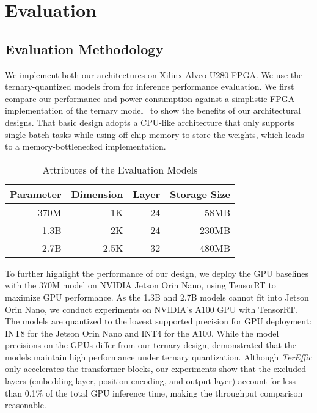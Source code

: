 \section{Evaluation}
\subsection{Evaluation Methodology}
We implement both our architectures on Xilinx Alveo U280 FPGA. We use the ternary-quantized models from \cite{scalable} for inference performance evaluation. 
We first compare our performance and power consumption against a simplistic FPGA implementation of the ternary model~\cite{scalable} to show the benefits of our architectural designs. That basic design adopts a CPU-like architecture that only supports single-batch tasks while using off-chip memory to store the weights, which leads to a memory-bottlenecked implementation.

\begin{table}[h]
    \vspace{-3mm}
    \centering
    \caption{Attributes of the Evaluation Models}
    \label{tab:models} 
    \begin{tabular}{|r|r|r|r|}
        \hline
        Parameter& Dimension & Layer & Storage Size  \\
        \hline
        370M & 1K & 24 & 58MB \\
        \hline
        1.3B & 2K & 24 & 230MB \\
        \hline
        2.7B & 2.5K
        & 32 & 480MB \\
        \hline
    \end{tabular}
    \vspace{-4mm}
\end{table}

To further highlight the performance of our design, we deploy the GPU baselines with the 370M model on NVIDIA Jetson Orin Nano, using TensorRT\cite{TensorRT} to maximize GPU performance. As the 1.3B and 2.7B models cannot fit into Jetson Orin Nano, we conduct experiments on NVIDIA's A100 GPU with TensorRT.  The models are quantized to the lowest supported precision for GPU deployment: INT8 for the Jetson Orin Nano and INT4 for the A100. While the model precisions on the GPUs differ from our ternary design, \cite{scalable} demonstrated that the models maintain high performance under ternary quantization. Although \textit{TerEffic} only accelerates the transformer blocks, our experiments show that the excluded layers (embedding layer, position encoding, and output layer) account for less than 0.1\% of the total GPU inference time, making the throughput comparison reasonable. 
